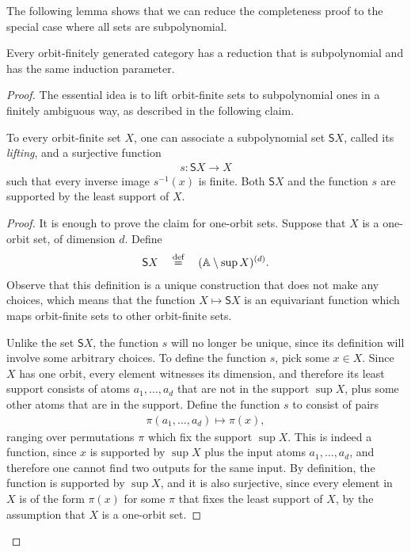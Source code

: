 The following lemma shows that we can reduce the completeness proof to the special case where all sets are subpolynomial. 

\begin{lemma}\label{lem:subpolynomial}
    Every orbit-finitely generated category has a reduction that is subpolynomial and has the same induction parameter. 
\end{lemma}
\begin{proof}
The essential idea is to lift orbit-finite sets to subpolynomial ones in a finitely ambiguous way, as described in the following claim.
\newcommand{\subpol}{\mathsf{S}}
    \begin{claim}
            To every orbit-finite set $X$, one can associate a subpolynomial set $\subpol X$, called its \emph{lifting}, and  a surjective function 
            \begin{align*}
            s : \subpol X \to X
            \end{align*}
            such that every inverse image $s^{-1}(x)$ is finite.  Both $\subpol X$ and the function $s$ are supported by the least support of $X$.
    \end{claim}
    \begin{proof}
        It is enough to prove the claim for one-orbit sets. Suppose that $X$ is a one-orbit set, of dimension $d$. Define 
        \begin{align}\label{eq:definition-of-lifting}
        \subpol X  
        \quad \eqdef \quad  (\atoms \setminus \sup X)^{(d)}.
        \end{align}
        Observe that this definition is a unique construction that does not make any choices, which means that the function $X \mapsto \subpol X$ is an equivariant function which maps orbit-finite sets to other orbit-finite sets. 
        
        Unlike the set $\subpol X$, the function $s$ will no longer be unique, since its definition will involve some arbitrary choices. 
        To define the function $s$, pick some $x \in X$. Since $X$ has one orbit, every element witnesses its dimension,  and therefore its least support consists of atoms $a_1,\ldots,a_d$ that are not in the support $\sup X$, plus some other atoms that are in the support. Define the function $s$ to consist of pairs
        \begin{align*}
         \pi(a_1,\ldots,a_d) \mapsto \pi(x),
        \end{align*}
        ranging over permutations $\pi$ which fix the support $\sup X$. This is indeed a function, since $x$ is supported by $\sup X$ plus the input atoms $a_1,\ldots,a_d$, and therefore one cannot find two outputs for the same input. By definition, the function is supported by $\sup X$, and it is also surjective, since every element in $X$ is of the form $\pi(x)$ for some $\pi$ that fixes the least support of $X$, by the assumption that $X$ is a one-orbit set.
    \end{proof}


\end{proof}
